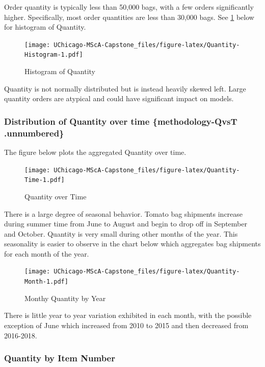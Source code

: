 \documentclass[12pt,oneside]{chicagocapstone}
\begin{document}
Order quantity is typically less than 50,000 bags, with a few orders
significantly higher. Specifically, most order quantities are less than
30,000 bags. See \ref{fig:Quantity-Histogram} below for histogram of
Quantity.
\begin{figure}
\centering
\texttt{[image: UChicago-MScA-Capstone\_files/figure-latex/Quantity-Histogram-1.pdf]}
\caption{\label{fig:Quantity-Histogram}Histogram of Quantity}
\end{figure}
Quantity is not normally distributed but is instead heavily skewed left.
Large quantity orders are atypical and could have significant impact on
models.

\subsubsection{Distribution of Quantity over time \{methodology-QvsT
.unnumbered\}}\label{distribution-of-quantity-over-time-methodology-qvst-.unnumbered}

The figure below plots the aggregated Quantity over time.
\begin{figure}
\centering
\texttt{[image: UChicago-MScA-Capstone\_files/figure-latex/Quantity-Time-1.pdf]}
\caption{\label{fig:Quantity-Time}Quantity over Time}
\end{figure}
There is a large degree of seasonal behavior. Tomato bag shipments
increase during summer time from June to August and begin to drop off in
September and October. Quantity is very small during other months of the
year. This seasonality is easier to observe in the chart below which
aggregates bag shipments for each month of the year.
\begin{figure}
\centering
\texttt{[image: UChicago-MScA-Capstone\_files/figure-latex/Quantity-Month-1.pdf]}
\caption{\label{fig:Quantity-Month}Monthy Quantity by Year}
\end{figure}
There is little year to year variation exhibited in each month, with the
possible exception of June which increased from 2010 to 2015 and then
decreased from 2016-2018.

\subsubsection*{Quantity by Item Number}\label{methodology-IN}
\end{document}
